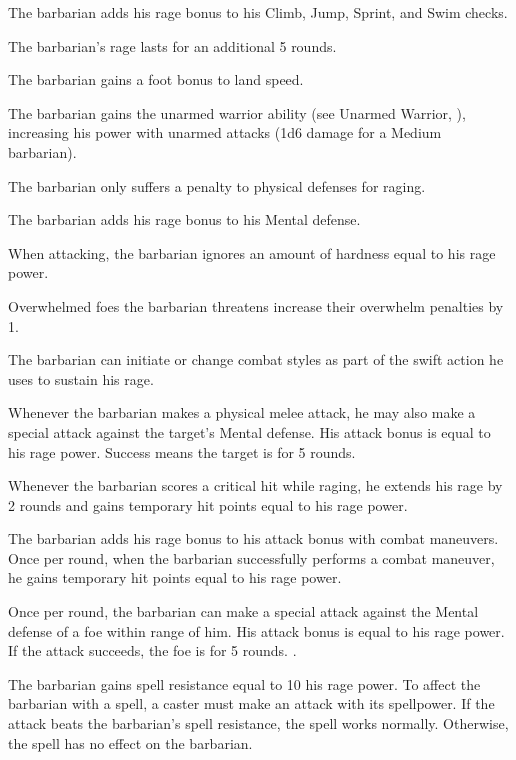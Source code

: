 The barbarian adds his rage bonus to his Climb, Jump, Sprint, and Swim checks.

The barbarian's rage lasts for an additional 5 rounds.

The barbarian gains a  foot bonus to land speed.

The barbarian gains the unarmed warrior ability (see Unarmed Warrior, ), increasing his power with unarmed attacks (1d6 damage for a Medium barbarian).

The barbarian only suffers a  penalty to physical defenses for raging.

The barbarian adds his rage bonus to his Mental defense.

When attacking, the barbarian ignores an amount of hardness equal to his rage power.

Overwhelmed foes the barbarian threatens increase their overwhelm penalties by 1.

The barbarian can initiate or change combat styles as part of the swift action he uses to sustain his rage.

Whenever the barbarian makes a physical melee attack, he may also make a special attack against the target's Mental defense.
His attack bonus is equal to his rage power.
Success means the target is \shaken for 5 rounds.
\norepeatnotes

Whenever the barbarian scores a critical hit while raging, he extends his rage by 2 rounds and gains temporary hit points equal to his rage power.

The barbarian adds his rage bonus to his attack bonus with combat maneuvers.
Once per round, when the barbarian successfully performs a combat maneuver, he gains temporary hit points equal to his rage power.

Once per round, the barbarian can make a special attack against the Mental defense of a foe within \rngmed range of him.
His attack bonus is equal to his rage power.
If the attack succeeds, the foe is \taunted for 5 rounds.
\norepeatnotes.

The barbarian gains spell resistance equal to 10 \add his rage power.
To affect the barbarian with a spell, a caster must make an attack with its spellpower.
If the attack beats the barbarian's spell resistance, the spell works normally.
Otherwise, the spell has no effect on the barbarian.

